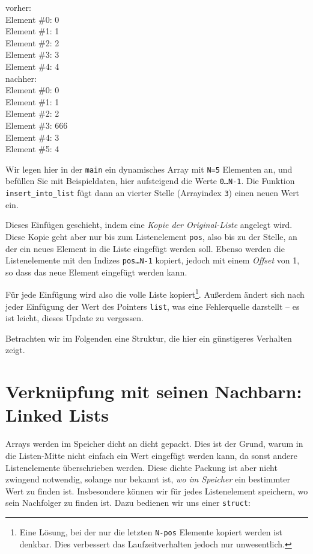 \begin{cmdbox}
vorher:\\
Element \#0:   0\\
Element \#1:   1\\
Element \#2:   2\\
Element \#3:   3\\
Element \#4:   4\\
nachher:\\
Element \#0:   0\\
Element \#1:   1\\
Element \#2:   2\\
Element \#3: 666\\
Element \#4:   3\\
Element \#5:   4
\end{cmdbox}
Wir legen hier in der \texttt{main} ein dynamisches Array mit \texttt{N=5} Elementen an, und befüllen Sie mit Beispieldaten, hier aufsteigend die Werte \texttt{0\ldots N-1}. Die Funktion 
\texttt{insert\_into\_list} fügt dann an vierter Stelle (Arrayindex \texttt{3}) einen neuen Wert ein.

Dieses Einfügen geschieht, indem eine \emph{Kopie der Original-Liste} angelegt wird. Diese Kopie geht aber nur bis zum Listenelement \texttt{pos}, also bis zu der Stelle, an der ein neues Element in die Liste eingefügt werden soll. Ebenso werden die Listenelemente mit den Indizes \texttt{pos\ldots N-1} kopiert, jedoch mit einem \emph{Offset} von 1, so dass das neue Element eingefügt werden kann.

Für jede Einfügung wird also die volle Liste kopiert\footnote{Eine Lösung, bei der nur die letzten \texttt{N-pos} Elemente kopiert werden ist denkbar. Dies verbessert das Laufzeitverhalten jedoch nur unwesentlich.}. Außerdem ändert sich nach jeder Einfügung der Wert des Pointers \texttt{list}, was eine Fehlerquelle darstellt -- es ist leicht, dieses Update zu vergessen.

Betrachten wir im Folgenden eine Struktur, die hier ein günstigeres Verhalten zeigt.

\section{Verknüpfung mit seinen Nachbarn: Linked Lists}
Arrays werden im Speicher dicht an dicht gepackt. Dies ist der Grund, warum in die Listen-Mitte nicht einfach ein Wert eingefügt werden kann, da sonst andere Listenelemente überschrieben werden. Diese dichte Packung ist aber nicht zwingend notwendig, solange nur bekannt ist, \emph{wo im Speicher} ein bestimmter Wert zu finden ist. Insbesondere können wir für jedes Listenelement speichern, wo sein Nachfolger zu finden ist. Dazu bedienen wir uns einer \texttt{struct}:


